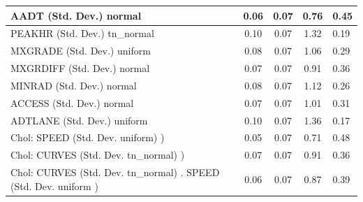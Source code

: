 \begin{table}
\begin{center}
\begin{tabular}{|l|l|c|c|c|l|}
			AADT (Std. Dev.) normal &  & 0.06 & 0.07 & 0.76 & 0.45 \\
			\hline
			PEAKHR (Std. Dev.) tn_normal &  & 0.10 & 0.07 & 1.32 & 0.19 \\
			\hline
			MXGRADE (Std. Dev.) uniform &  & 0.08 & 0.07 & 1.06 & 0.29 \\
			\hline
			MXGRDIFF (Std. Dev.) normal &  & 0.07 & 0.07 & 0.91 & 0.36 \\
			\hline
			MINRAD (Std. Dev.) normal &  & 0.08 & 0.07 & 1.12 & 0.26 \\
			\hline
			ACCESS (Std. Dev.) normal &  & 0.07 & 0.07 & 1.01 & 0.31 \\
			\hline
			ADTLANE (Std. Dev.) uniform &  & 0.10 & 0.07 & 1.36 & 0.17 \\
			\hline
			 Chol: SPEED (Std. Dev. uniform) ) &  & 0.05 & 0.07 & 0.71 & 0.48 \\
			\hline
			 Chol: CURVES (Std. Dev. tn_normal) ) &  & 0.07 & 0.07 & 0.91 & 0.36 \\
			\hline
			 Chol: CURVES (Std. Dev. tn_normal) . SPEED (Std. Dev.   uniform ) &  & 0.06 & 0.07 & 0.87 & 0.39 \\
			\hline
		\end{tabular}
	\end{center}
\end{table}